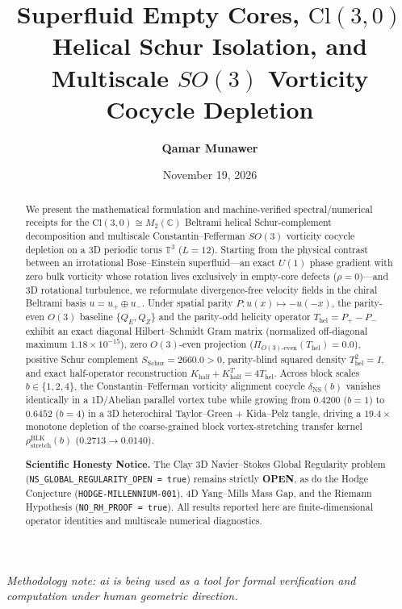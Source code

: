 \documentclass[11pt,a4paper]{article}
\title{\textbf{Superfluid Empty Cores, \texorpdfstring{$\mathrm{Cl}(3,0)$}{Cl(3,0)} Helical Schur Isolation, and Multiscale \texorpdfstring{$SO(3)$}{SO(3)} Vorticity Cocycle Depletion}}
\author{\textbf{Qamar Munawer}}
\date{November 19, 2026}
\begin{document}
\maketitle
\vspace{0.5em}\noindent\textit{Methodology note: ai is being used as a tool for formal verification and computation under human geometric direction.}

\begin{abstract}
We present the mathematical formulation and machine-verified spectral/numerical receipts for the $\mathrm{Cl}(3,0) \cong M_2(\mathbb{C})$ Beltrami helical Schur-complement decomposition and multiscale Constantin--Fefferman $SO(3)$ vorticity cocycle depletion on a 3D periodic torus $\mathbb{T}^3$ ($L = 12$). Starting from the physical contrast between an irrotational Bose--Einstein superfluid---an exact $U(1)$ phase gradient with zero bulk vorticity whose rotation lives exclusively in empty-core defects ($\rho = 0$)---and 3D rotational turbulence, we reformulate divergence-free velocity fields in the chiral Beltrami basis $u = u_+ \oplus u_-$. Under spatial parity $P: u(x) \mapsto -u(-x)$, the parity-even $O(3)$ baseline $\{Q_E, Q_Z\}$ and the parity-odd helicity operator $T_{\mathrm{hel}} = P_+ - P_-$ exhibit an exact diagonal Hilbert--Schmidt Gram matrix (normalized off-diagonal maximum $1.18 \times 10^{-15}$), zero $O(3)$-even projection ($\Pi_{O(3)\text{-even}}(T_{\mathrm{hel}}) = 0.0$), positive Schur complement $S_{\mathrm{Schur}} = 2660.0 > 0$, parity-blind squared density $T_{\mathrm{hel}}^2 = I$, and exact half-operator reconstruction $K_{\mathrm{half}} + K_{\mathrm{half}}^T = 4 T_{\mathrm{hel}}$. Across block scales $b \in \{1, 2, 4\}$, the Constantin--Fefferman vorticity alignment cocycle $\delta_{\mathrm{NS}}(b)$ vanishes identically in a 1D/Abelian parallel vortex tube while growing from $0.4200$ ($b=1$) to $0.6452$ ($b=4$) in a 3D heterochiral Taylor--Green + Kida--Pelz tangle, driving a $19.4\times$ monotone depletion of the coarse-grained block vortex-stretching transfer kernel $\rho_{\mathrm{stretch}}^{\mathrm{BLK}}(b)$ ($0.2713 \to 0.0140$).

\medskip
\noindent\textbf{Scientific Honesty Notice.} The Clay 3D Navier--Stokes Global Regularity problem (\texttt{NS\_GLOBAL\_REGULARITY\_OPEN = true}) remains strictly \textbf{OPEN}, as do the Hodge Conjecture (\texttt{HODGE-MILLENNIUM-001}), 4D Yang--Mills Mass Gap, and the Riemann Hypothesis (\texttt{NO\_RH\_PROOF = true}). All results reported here are finite-dimensional operator identities and multiscale numerical diagnostics.
\end{abstract}
\end{document}
